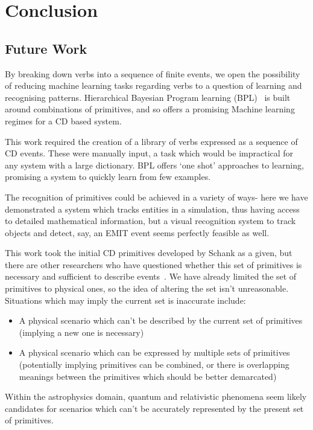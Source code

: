 \documentclass{article}
\begin{document}
    \section{Conclusion}
    \subsection{Future Work}
    By breaking down verbs into a sequence of finite events, we open the possibility of reducing machine learning tasks regarding verbs to a question of learning and recognising patterns. Hierarchical Bayesian Program learning (BPL)~\cite{one-shot-learning} is built around combinations of primitives, and so offers a promising Machine learning regimes for a CD based system.
    
    This work required the creation of a library of verbs expressed as a sequence of CD events. These were manually input, a task which would be impractical for any system with a large dictionary. BPL offers `one shot' approaches to learning, promising a system to quickly learn from few examples.
    
    The recognition of primitives could be achieved in a variety of ways- here we have demonstrated a system which tracks entities in a simulation, thus having access to detailed mathematical information, but a visual recognition system to track objects and detect, say, an EMIT event seems perfectly feasible as well.

    This work took the initial CD primitives developed by Schank as a given, but there are other researchers who have questioned whether this set of primitives is necessary and sufficient to describe events~\cite{macbethimage}. We have already limited the set of primitives to physical ones, so the idea of altering the set isn't unreasonable. Situations which may imply the current set is inaccurate include:
    \begin{itemize}
        \item A physical scenario which can't be described by the current set of primitives (implying a new one is necessary)
        \item A physical scenario which can be expressed by multiple sets of primitives (potentially implying primitives can be combined, or there is overlapping meanings between the primitives which should be better demarcated)
    \end{itemize}

    Within the astrophysics domain, quantum and relativistic phenomena seem likely candidates for scenarios which can't be accurately represented by the present set of primitives.

    
    

    
    
\end{document}

